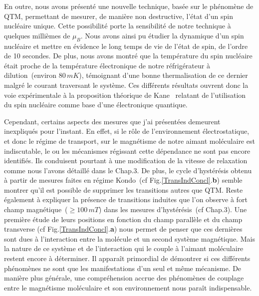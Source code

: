 En outre, nous avons présenté une nouvelle technique, basée sur le phénomène de QTM, permettant de mesurer, de manière non destructive, l'état d'un spin nucléaire unique. Cette possibilité porte la sensibilité de notre technique à quelques millièmes de $\mu_B$. Nous avons ainsi pu étudier la dynamique d'un spin nucléaire et mettre en évidence le long temps de vie de l'état de spin, de l'ordre de 10 secondes. De plus, nous avons montré que la température du spin nucléaire était proche de la température électronique de notre réfrigérateur à dilution~(environ 80$\,mK$), témoignant d'une bonne thermalisation de ce dernier malgré le courant traversant le système. Ces différents résultats ouvrent donc la voie expérimentale à la proposition théorique de Kane~\cite{Kane1998} relatant de l'utilisation du spin nucléaire comme base d'une électronique quantique.


Cependant, certains aspects des mesures que j'ai présentées demeurent inexpliqués pour l'instant. En effet, si le rôle de l’environnement électrostatique, et donc le régime de transport, sur le magnétisme de notre aimant moléculaire est indiscutable, le ou les mécanismes régissant cette dépendance ne sont pas encore identifiés. Ils conduisent pourtant à une modification de la vitesse de relaxation comme nous l'avons détaillé dans le Chap.3. De plus, le cycle d’hystérésis obtenu à partir de mesures faites en régime Kondo~(cf Fig.\ref{TransIndConcl}.\textbf{b}) semble montrer qu'il est possible de supprimer les transitions autres que QTM.  Reste également à expliquer la présence de transitions induites que l'on observe à fort champ magnétique~($\geq 100\,mT$) dans les mesures d’hystérésis~(cf Chap.3). Une première étude de leurs positions en fonction du champ parallèle et du champ transverse (cf Fig.\ref{TransIndConcl}.\textbf{a}) nous permet de penser que ces dernières sont dues à l'interaction entre la molécule et un second système magnétique. Mais la nature de ce système et de l'interaction qui le couple à l'aimant moléculaire restent encore à déterminer. Il apparaît primordial de démontrer si ces différents phénomènes ne sont que les manifestations d'un seul et même mécanisme. De manière plus générale, une compréhension accrue des phénomènes de couplage entre le magnétisme moléculaire et son environnement nous paraît indispensable.

